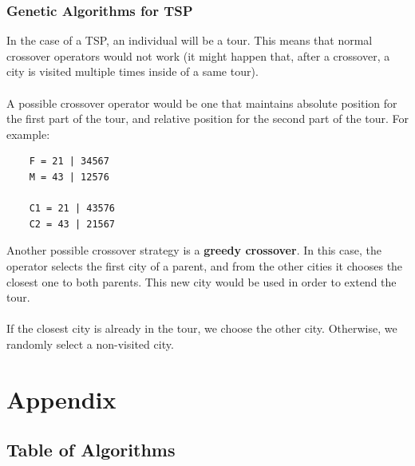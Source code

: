 \documentclass{article}
\begin{document}
\subsubsection{Genetic Algorithms for TSP}
In the case of a TSP, an individual will be a tour. This means that normal crossover operators would not work (it might happen that, after a crossover, a city is visited multiple times inside of a same tour). \\ \\
A possible crossover operator would be one that maintains absolute position for the first part of the tour, and relative position for the second part of the tour. For example:

\begin{verbatim}
    F = 21 | 34567
    M = 43 | 12576
    
    C1 = 21 | 43576
    C2 = 43 | 21567
\end{verbatim}
Another possible crossover strategy is a \textbf{greedy crossover}. In this case, the operator selects the first city of a parent, and from the other cities it chooses the closest one to both parents. This new city would be used in order to extend the tour. \\ \\
If the closest city is already in the tour, we choose the other city. Otherwise, we randomly select a non-visited city.

\newpage

\section{Appendix}
\subsection{Table of Algorithms}
\end{document}
